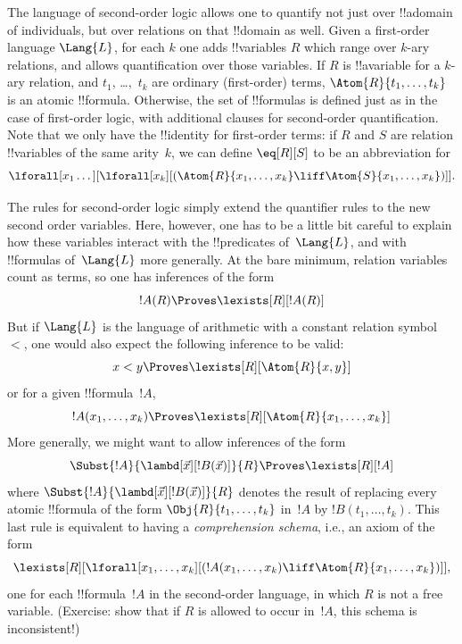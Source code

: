 \documentclass[../../../include/open-logic-section]{subfiles}
\begin{document}


The language of second-order logic allows one to quantify not just
over !!a{domain} of individuals, but over relations on that
!!{domain} as well. Given a first-order language $\Lang{L}$, for each
$k$ one adds !!{variable}s $R$ which range over $k$-ary relations, and
allows quantification over those variables. If $R$ is !!a{variable} for a
$k$-ary relation, and $t_1$, \dots,~$t_k$ are ordinary (first-order) terms,
$\Atom{R}{t_1,\dots,t_k}$ is an atomic !!{formula}. Otherwise, the set of
!!{formula}s is defined just as in the case of first-order logic, with
additional clauses for second-order quantification. Note that we only
have the !!{identity} for first-order terms: if $R$ and $S$ are relation
!!{variable}s of the same arity~$k$, we can define $\eq[R][S]$ to be an
abbreviation for
\[
\lforall[x_1 \dots][\lforall[x_k][(\Atom{R}{x_1, \dots, x_k} \liff
  \Atom{S}{x_1, \dots, x_k})]].
\]

The rules for second-order logic simply extend the quantifier rules to
the new second order variables. Here, however, one has to be a little
bit careful to explain how these variables interact with the !!{predicate}s
of~$\Lang{L}$, and with !!{formula}s of~$\Lang{L}$ more generally. At the bare
minimum, relation variables count as terms, so one has inferences of
the form
\[
!A(R) \Proves \lexists[R][!A(R)]
\]
But if $\Lang{L}$ is the language of arithmetic with a constant
relation symbol~$<$, one would also expect the following inference to
be valid:
\[
x < y \Proves \lexists[R][\Atom{R}{x,y}]
\]
or for a given !!{formula}~$!A$,
\[
!A(x_1, \dots, x_k) \Proves \lexists[R][\Atom{R}{x_1,\dots,x_k}]
\]
More generally, we might want to allow inferences of the form
\[
\Subst{!A}{\lambd[\vec x][!B(\vec x)]}{R} \Proves
\lexists[R][!A]
\]
where $\Subst{!A}{\lambd[\vec x][!B(\vec x)]}{R}$ denotes the result
of replacing every atomic !!{formula} of the form
$\Obj{R}{t_1,\dots,t_k}$ in~$!A$ by $!B(t_1, \dots, t_k)$. This last
rule is equivalent to having a {\em comprehension schema}, i.e., an
axiom of the form
\[
\lexists[R][\lforall[x_1, \dots, x_k][(!A(x_1, \dots, x_k) \liff
\Atom{R}{x_1, \dots, x_k})]],
\]
one for each !!{formula}~$!A$ in the second-order language, in which
$R$ is not a free variable. (Exercise: show that if $R$ is allowed to
occur in~$!A$, this schema is inconsistent!)
\end{document}
